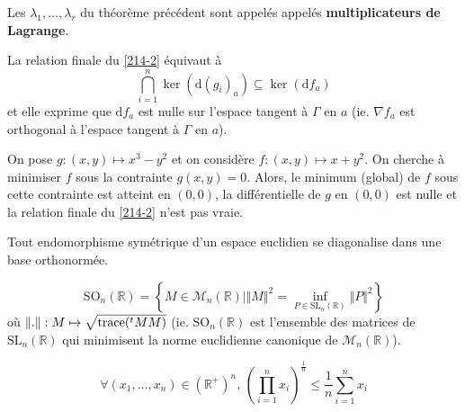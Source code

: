   \begin{definition}
    Les $\lambda_1, \dots, \lambda_r$ du théorème précédent sont appelés appelés \textbf{multiplicateurs de Lagrange}.
  \end{definition}


  \begin{remark}
    La relation finale du \cref{214-2} équivaut à
    \[ \bigcap_{i=1}^n \ker(\mathrm{d}(g_i)_a) \subseteq \ker(\mathrm{d}f_a) \]
    et elle exprime que $\mathrm{d}f_a$ est nulle sur l'espace tangent à $\Gamma$ en $a$ (ie. $\nabla f_a$ est orthogonal à l'espace tangent à $\Gamma$ en $a$).
  \end{remark}

  \begin{cexample}
    On pose $g : (x,y) \mapsto x^3-y^2$ et on considère $f : (x, y) \mapsto x+y^2$. On cherche à minimiser $f$ sous la contrainte $g(x,y) = 0$.
    \newpar
    Alors, le minimum (global) de $f$ sous cette contrainte est atteint en $(0,0)$, la différentielle de $g$ en $(0,0)$ est nulle et la relation finale du \cref{214-2} n'est pas vraie.
  \end{cexample}

  \begin{application}
    Tout endomorphisme symétrique d'un espace euclidien se diagonalise dans une base orthonormée.
  \end{application}


  \begin{application}
    \[ \mathrm{SO}_n(\mathbb{R}) = \left\{ M \in \mathcal{M}_n(\mathbb{R}) \mid \Vert M \Vert^2 = \inf_{P \in \mathrm{SL}_n(\mathbb{R})} \Vert P \Vert^2 \right\} \]
    où $\Vert . \Vert : M \mapsto \sqrt{\operatorname{trace}(\mathstrut ^t MM)}$ (ie. $\mathrm{SO}_n(\mathbb{R})$ est l'ensemble des matrices de $\mathrm{SL}_n(\mathbb{R})$ qui minimisent la norme euclidienne canonique de $\mathcal{M}_n(\mathbb{R})$).
  \end{application}


  \begin{application}
    \[ \forall (x_1, \dots, x_n) \in (\mathbb{R}^+)^n, \, \left( \prod_{i=1}^{n} x_i \right)^{\frac{1}{n}} \leq \frac{1}{n} \sum_{i=1}^n x_i \]
  \end{application}


